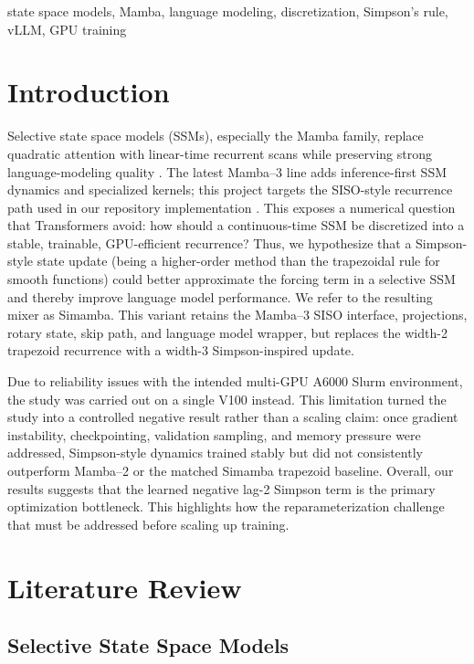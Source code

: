 \documentclass[conference]{IEEEtran}
\newcommand{\modelname}{Simamba\xspace}
\newcommand{\mamba}{Mamba\xspace}
\newcommand{\mambatwo}{Mamba--2\xspace}
\newcommand{\mambathree}{Mamba--3\xspace}
\begin{document}
\begin{IEEEkeywords}
state space models, Mamba, language modeling, discretization, Simpson's rule, vLLM, GPU training
\end{IEEEkeywords}

\section{Introduction}

Selective state space models (SSMs), especially the \mamba family, replace quadratic attention with linear-time recurrent scans while preserving strong language-modeling quality \cite{mamba,mamba2}. The latest \mambathree line adds inference-first SSM dynamics and specialized kernels; this project targets the SISO-style recurrence path used in our repository implementation \cite{mamba3}. This exposes a numerical question that Transformers avoid: how should a continuous-time SSM be discretized into a stable, trainable, GPU-efficient recurrence? Thus, we hypothesize that a Simpson-style state update (being a higher-order method than the trapezoidal rule for smooth functions) could better approximate the forcing term in a selective SSM and thereby improve language model performance. We refer to the resulting mixer as \modelname. This variant retains the \mambathree SISO interface, projections, rotary state, skip path, and language model wrapper, but replaces the width-2 trapezoid recurrence with a width-3 Simpson-inspired update.

Due to reliability issues with the intended multi-GPU A6000 Slurm environment, the study was carried out on a single V100 instead. This limitation turned the study into a controlled negative result rather than a scaling claim: once gradient instability, checkpointing, validation sampling, and memory pressure were addressed, Simpson-style dynamics trained stably but did not consistently outperform \mambatwo or the matched \modelname trapezoid baseline. Overall, our results suggests that the learned negative lag-2 Simpson term is the primary optimization bottleneck. This highlights how the reparameterization challenge that must be addressed before scaling up training.

\section{Literature Review}

\subsection{Selective State Space Models}
\end{document}

